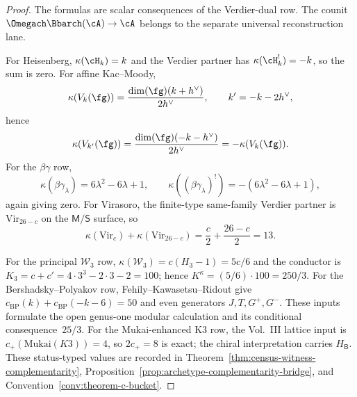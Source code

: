 \begin{proof}
The formulas are scalar consequences of the Verdier-dual row.  The
counit $\Omegach\Bbarch(\cA)\to\cA$ belongs to the separate universal
reconstruction lane.

For Heisenberg, $\kappa(\cH_k)=k$ and the Verdier partner has
$\kappa(\cH_k^!)=-k$, so the sum is zero.  For affine Kac--Moody,
\[
\kappa(V_k(\fg))=\frac{\dim(\fg)(k+h^\vee)}{2h^\vee},\qquad
k'=-k-2h^\vee,
\]
hence
\[
\kappa(V_{k'}(\fg))
=\frac{\dim(\fg)(-k-h^\vee)}{2h^\vee}
=-\kappa(V_k(\fg)).
\]
For the $\beta\gamma$ row,
\[
\kappa(\beta\gamma_\lambda)=6\lambda^2-6\lambda+1,\qquad
\kappa((\beta\gamma_\lambda)^!)
=-(6\lambda^2-6\lambda+1),
\]
again giving zero.  For Virasoro, the finite-type same-family
Verdier partner is $\mathrm{Vir}_{26-c}$ on the
$\mathsf M/\mathsf S$ surface, so
\[
\kappa(\mathrm{Vir}_c)+\kappa(\mathrm{Vir}_{26-c})
=\frac{c}{2}+\frac{26-c}{2}=13.
\]

For the principal $\mathcal W_3$ row,
$\kappa(\mathcal W_3)=c(H_3-1)=5c/6$ and the conductor is
$K_3=c+c'=4\cdot3^3-2\cdot3-2=100$; hence
$K^\kappa=(5/6)\cdot100=250/3$.  For the
Bershadsky--Polyakov row, Fehily--Kawasetsu--Ridout give
$c_{\mathrm{BP}}(k)+c_{\mathrm{BP}}(-k-6)=50$ and even generators
$J,T,G^+,G^-$.  These inputs formulate the open genus-one modular
calculation and its conditional consequence~$25/3$.  For the
Mukai-enhanced K3 row, the Vol.~III lattice input is
$c_+(\mathrm{Mukai}(K3))=4$, so $2c_+=8$ is exact; the chiral
interpretation carries $H_{\mathsf B}$.  These status-typed values are
recorded in
Theorem~\ref{thm:census-witness-complementarity},
Proposition~\ref{prop:archetype-complementarity-bridge}, and
Convention~\ref{conv:theorem-c-bucket}.
\end{proof}

